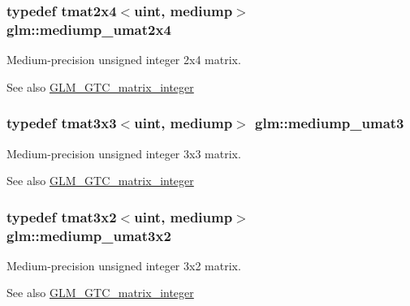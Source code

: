 \subsubsection[{mediump\+\_\+umat2x4}]{\setlength{\rightskip}{0pt plus 5cm}typedef tmat2x4$<${\bf uint}, mediump$>$ {\bf glm\+::mediump\+\_\+umat2x4}}\label{group__gtc__matrix__integer_ga972445669c6e6652716f3f0b664b94cd}
Medium-\/precision unsigned integer 2x4 matrix. \begin{DoxySeeAlso}{See also}
\hyperlink{group__gtc__matrix__integer}{G\+L\+M\+\_\+\+G\+T\+C\+\_\+matrix\+\_\+integer} 
\end{DoxySeeAlso}
\hypertarget{group__gtc__matrix__integer_ga953d4cb3e70d85567756b3fbcca0e9e9}{}
\subsubsection[{mediump\+\_\+umat3}]{\setlength{\rightskip}{0pt plus 5cm}typedef tmat3x3$<${\bf uint}, mediump$>$ {\bf glm\+::mediump\+\_\+umat3}}\label{group__gtc__matrix__integer_ga953d4cb3e70d85567756b3fbcca0e9e9}
Medium-\/precision unsigned integer 3x3 matrix. \begin{DoxySeeAlso}{See also}
\hyperlink{group__gtc__matrix__integer}{G\+L\+M\+\_\+\+G\+T\+C\+\_\+matrix\+\_\+integer} 
\end{DoxySeeAlso}
\hypertarget{group__gtc__matrix__integer_ga62243caa5b85b1cf91021ce6ffc21183}{}
\subsubsection[{mediump\+\_\+umat3x2}]{\setlength{\rightskip}{0pt plus 5cm}typedef tmat3x2$<${\bf uint}, mediump$>$ {\bf glm\+::mediump\+\_\+umat3x2}}\label{group__gtc__matrix__integer_ga62243caa5b85b1cf91021ce6ffc21183}
Medium-\/precision unsigned integer 3x2 matrix. \begin{DoxySeeAlso}{See also}
\hyperlink{group__gtc__matrix__integer}{G\+L\+M\+\_\+\+G\+T\+C\+\_\+matrix\+\_\+integer} 
\end{DoxySeeAlso}
\hypertarget{group__gtc__matrix__integer_gaa55f7815a399a780907a1dcd4caef7d9}{}
